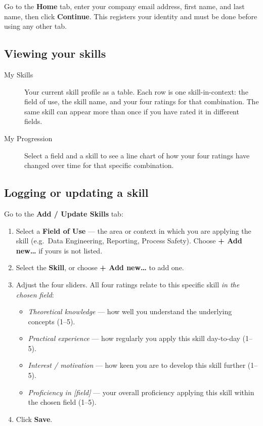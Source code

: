 \documentclass[11pt,a4paper]{article}
\begin{document}
Go to the \textbf{Home} tab, enter your company email address, first name, and last name, then click
\textbf{Continue}. This registers your identity and must be done before using any other tab.

\subsection*{Viewing your skills}

\begin{description}
\item[My Skills] Your current skill profile as a table. Each row is one skill-in-context: the field of use,
  the skill name, and your four ratings for that combination.
  The same skill can appear more than once if you have rated it in different fields.
\item[My Progression] Select a field and a skill to see a line chart of how your four ratings have changed
  over time for that specific combination.
\end{description}

\subsection*{Logging or updating a skill}

Go to the \textbf{Add / Update Skills} tab:
\begin{enumerate}
  \item Select a \textbf{Field of Use} --- the area or context in which you are applying the skill
    (e.g.\ Data Engineering, Reporting, Process Safety). Choose \textbf{+ Add new\ldots} if yours is not listed.
  \item Select the \textbf{Skill}, or choose \textbf{+ Add new\ldots} to add one.
  \item Adjust the four sliders. All four ratings relate to this specific skill \emph{in the chosen field}:
    \begin{itemize}
      \item \emph{Theoretical knowledge} --- how well you understand the underlying concepts (1--5).
      \item \emph{Practical experience} --- how regularly you apply this skill day-to-day (1--5).
      \item \emph{Interest / motivation} --- how keen you are to develop this skill further (1--5).
      \item \emph{Proficiency in [field]} --- your overall proficiency applying this skill within the chosen field (1--5).
    \end{itemize}
  \item Click \textbf{Save}.
\end{enumerate}
\end{document}
